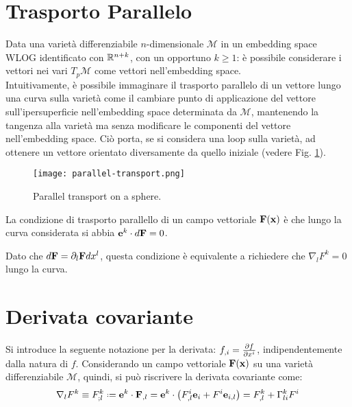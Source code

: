 \section{Trasporto Parallelo}

Data una varietà differenziabile $ n $-dimensionale $ \mathcal{M} $ in un embedding space WLOG identificato con $ \mathbb{R}^{n+k} $, con un opportuno $ k \ge 1 $: è possibile considerare i vettori nei vari $ T_p\mathcal{M} $ come vettori nell'embedding space.\\
Intuitivamente, è possibile immaginare il trasporto parallelo di un vettore lungo una curva sulla varietà come il cambiare punto di applicazione del vettore sull'ipersuperficie nell'embedding space determinata da $ \mathcal{M} $, mantenendo la tangenza alla varietà ma senza modificare le componenti del vettore nell'embedding space. Ciò porta, se si considera una loop sulla varietà, ad ottenere un vettore orientato diversamente da quello iniziale (vedere Fig. \ref{par-tr}).
\begin{figure}
	\centering
	\texttt{[image: parallel-transport.png]}
	\caption{Parallel transport on a sphere.}
	\label{par-tr}
\end{figure}

\begin{proposition}
	La condizione di trasporto parallello di un campo vettoriale $ \mathbf{F}(\mathbf{x}) $ è che lungo la curva considerata si abbia $ \mathbf{e}^k \cdot d\mathbf{F} = 0 $.
\end{proposition}
Dato che $ d\mathbf{F} = \partial_l \mathbf{F} dx^l $, questa condizione è equivalente a richiedere che $ \nabla_l F^k = 0 $ lungo la curva.

\section{Derivata covariante}

Si introduce la seguente notazione per la derivata: $ f_{,i} = \frac{\partial f}{\partial x^i} $, indipendentemente dalla natura di $ f $.
Considerando un campo vettoriale $ \mathbf{F}(\mathbf{x}) $ su una varietà differenziabile $ \mathcal{M} $, quindi, si può riscrivere la derivata covariante come:
\begin{equation}
	\nabla_l F^k \equiv F^k_{;l} \defeq \ve{e}^k \cdot \ve{F}_{,l} = \ve{e}^k \cdot \left( F^i_{,l} \ve{e}_i + F^i \ve{e}_{i,l} \right) = F^k_{,l} + \Gamma^k_{li} F^i
	\label{eq:4.7}
\end{equation}

